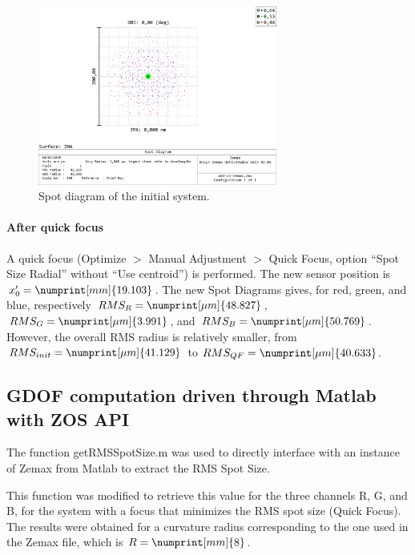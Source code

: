 \documentclass[10pt,letterpaper]{article}
\begin{document}
\begin{figure}[h]
    \centering
    \includegraphics[width=0.7\textwidth]{IO25_TP4_SpotDiagram_init_2000.png}
    \caption{Spot diagram of the initial system.}
    \label{fig:Spot_diag_init}
\end{figure}

\paragraph{After quick focus\\} \label{manual-qf}
A quick focus (Optimize $>$ Manual Adjustment $>$ Quick Focus, option “Spot Size Radial” without “Use centroid”) is performed. The new sensor position is $x'_0 = \numprint[mm]{19.103}$. The new Spot Diagrams gives, for red, green, and blue, respectively $RMS_R = \numprint[\mu m]{48.827}$, $RMS_G = \numprint[\mu m]{3.991}$, and $RMS_B = \numprint[\mu m]{50.769}$. However, the overall RMS radius is relatively smaller, from $RMS_{init} = \numprint[\mu m]{41.129}$ to $RMS_{QF} = \numprint[\mu m]{40.633}$.



\subsection{GDOF computation driven through Matlab with ZOS API}

The function get\textunderscore RMS\textunderscore SpotSize.m was used to directly interface with an instance of Zemax from Matlab to extract the RMS Spot Size. 

This function was modified to retrieve this value for the three channels R, G, and B, for the system with a focus that minimizes the RMS spot size (Quick Focus). The results were obtained for a curvature radius corresponding to the one used in the Zemax file, which is $R= \numprint[mm]{8}$.
\end{document}
